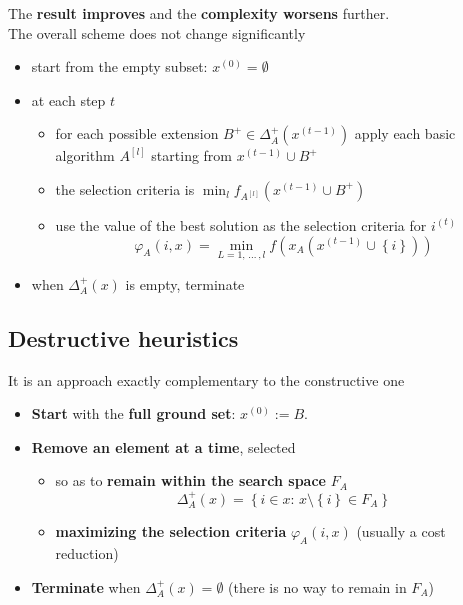 The \textbf{result improves} and the \textbf{complexity worsens} further.\\

The overall scheme does not change significantly
\begin{itemize}
	\item start from the empty subset: $x^{(0)} = \emptyset$
	
	\item at each step $t$
	\begin{itemize}
		\item for each possible extension $B^+ \in \Delta_A^+ (x^{(t−1)})$ apply each basic algorithm $A^{[l]}$ starting from $x^{(t−1)} \cup B^+$
		
		\item the selection criteria is $\min_l f_{A^{[l]}} (x^{(t−1)} \cup B^+)$
		
		\item use the value of the best solution as the selection criteria for $i^{(t)}$
		$$ \varphi_A (i,x) = \min_{L = 1, \, ... \, , l} f \left(x_A \left(x^{(t-1)} \cup \left\{i\right\} \right) \right) $$
	\end{itemize}
	\item when $\Delta_A^+ (x)$ is empty, terminate
\end{itemize}

\newpage

\subsection{Destructive heuristics}
It is an approach exactly complementary to the constructive one
\begin{itemize}
	\item \textbf{Start} with the \textbf{full ground set}: $x^{(0)} := B$.\\
	
	\item \textbf{Remove an element at a time}, selected 
	\begin{itemize}
		\item so as to \textbf{remain within the search space} $F_A$
		$$ \Delta_A^+ (x) = \left\{i \in x : \, x \setminus \left\{i\right\} \in F_A \right\} $$
		
		\item \textbf{maximizing the selection criteria} $\varphi_A (i, x)$ (usually a cost reduction)
	\end{itemize}
	\nn
	
	\item \textbf{Terminate} when $\Delta_A^+ (x) = \emptyset$ (there is no way to remain in $F_A$)
\end{itemize}


